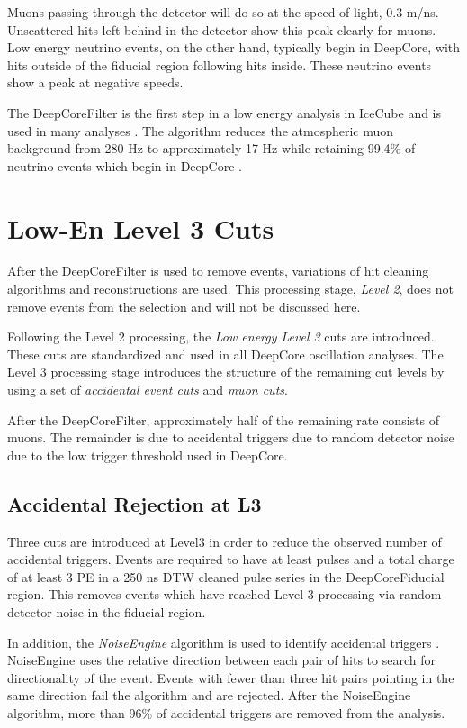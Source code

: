Muons passing through the detector will do so at the speed of light, 0.3 m/ns. 
Unscattered hits left behind in the detector show this peak clearly for muons.
Low energy neutrino events, on the other hand, typically begin in DeepCore, with hits outside of the fiducial region following hits inside. 
These neutrino events show a peak at negative speeds.

The DeepCoreFilter is the first step in a low energy analysis in IceCube and is used in many analyses \cite{Thesis-Vuvuzela,Thesis-Euler,IceCube-Oscillation2013,IceCube-Oscillation2015,IceCube-Oscillation2018}.
The algorithm reduces the atmospheric muon background from 280 Hz to approximately 17 Hz while retaining 99.4\% of neutrino events which begin in DeepCore \cite{Description-DeepCore}.

\graphicspath{{chapters/greco/images/level3/}}
\label{sec:level3}
\section{Low-En Level 3 Cuts}
After the DeepCoreFilter is used to remove events, variations of hit cleaning algorithms and reconstructions are used.
This processing stage, \emph{Level 2}, does not remove events from the selection and will not be discussed here.

Following the Level 2 processing, the \emph{Low energy Level 3} cuts are introduced.
These cuts are standardized and used in all DeepCore oscillation analyses.
The Level 3 processing stage introduces the structure of the remaining cut levels by using a set of \emph{accidental event cuts} and \emph{muon cuts}.

After the DeepCoreFilter, approximately half of the remaining rate consists of muons.
The remainder is due to accidental triggers due to random detector noise due to the low trigger threshold used in DeepCore.

\label{subsec:level3_noise}
\subsection{Accidental Rejection at L3}
Three cuts are introduced at Level3 in order to reduce the observed number of accidental triggers.
Events are required to have at least pulses and a total charge of at least 3 PE in a 250 ns DTW cleaned pulse series in the DeepCoreFiducial region.
This removes events which have reached Level 3 processing via random detector noise in the fiducial region.

In addition, the \emph{NoiseEngine} algorithm is used to identify accidental triggers \cite{Thesis-Vuvuzela}.
NoiseEngine uses the relative direction between each pair of hits to search for directionality of the event. 
Events with fewer than three hit pairs pointing in the same direction fail the algorithm and are rejected.
After the NoiseEngine algorithm, more than 96\% of accidental triggers are removed from the analysis.

